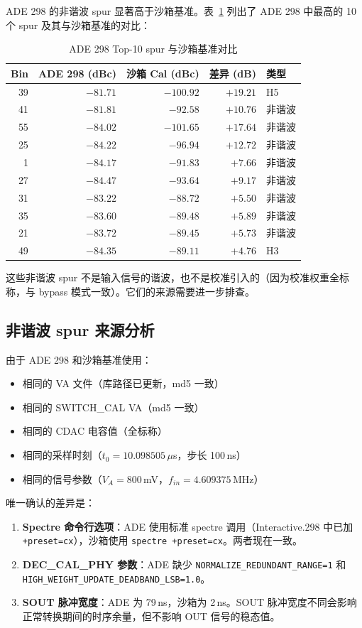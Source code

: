 \documentclass[12pt,a4paper]{article}
\begin{document}
ADE 298 的非谐波 spur 显著高于沙箱基准。表~\ref{tab:spurs} 列出了 ADE 298 中最高的 10 个 spur 及其与沙箱基准的对比：

\begin{table}[H]
\centering
\caption{ADE 298 Top-10 spur 与沙箱基准对比}
\label{tab:spurs}
\begin{tabular}{rrrrl}
\toprule
Bin & ADE 298 (dBc) & 沙箱 Cal (dBc) & 差异 (dB) & 类型 \\
\midrule
39 & $-81.71$ & $-100.92$ & $+19.21$ & H5 \\
41 & $-81.81$ & $-92.58$ & $+10.76$ & 非谐波 \\
55 & $-84.02$ & $-101.65$ & $+17.64$ & 非谐波 \\
25 & $-84.22$ & $-96.94$ & $+12.72$ & 非谐波 \\
1 & $-84.17$ & $-91.83$ & $+7.66$ & 非谐波 \\
27 & $-84.47$ & $-93.64$ & $+9.17$ & 非谐波 \\
31 & $-83.22$ & $-88.72$ & $+5.50$ & 非谐波 \\
35 & $-83.60$ & $-89.48$ & $+5.89$ & 非谐波 \\
21 & $-83.72$ & $-89.45$ & $+5.73$ & 非谐波 \\
49 & $-84.35$ & $-89.11$ & $+4.76$ & H3 \\
\bottomrule
\end{tabular}
\end{table}

这些非谐波 spur 不是输入信号的谐波，也不是校准引入的（因为校准权重全标称，与 bypass 模式一致）。它们的来源需要进一步排查。

\subsection{非谐波 spur 来源分析}

由于 ADE 298 和沙箱基准使用：
\begin{itemize}
\item 相同的 VA 文件（库路径已更新，md5 一致）
\item 相同的 SWITCH\_CAL VA（md5 一致）
\item 相同的 CDAC 电容值（全标称）
\item 相同的采样时刻（$t_0 = 10.098505\,\mu$s，步长 100\,ns）
\item 相同的信号参数（$V_A = 800$\,mV，$f_{in} = 4.609375$\,MHz）
\end{itemize}

唯一确认的差异是：

\begin{enumerate}
\item \textbf{Spectre 命令行选项}：ADE 使用标准 spectre 调用（Interactive.298 中已加 \texttt{+preset=cx}），沙箱使用 \texttt{spectre +preset=cx}。两者现在一致。

\item \textbf{DEC\_CAL\_PHY 参数}：ADE 缺少 \texttt{NORMALIZE\_REDUNDANT\_RANGE=1} 和 \texttt{HIGH\_WEIGHT\_UPDATE\_DEADBAND\_LSB=1.0}。

\item \textbf{SOUT 脉冲宽度}：ADE 为 79\,ns，沙箱为 2\,ns。SOUT 脉冲宽度不同会影响正常转换期间的时序余量，但不影响 OUT 信号的稳态值。
\end{enumerate}
\end{document}
